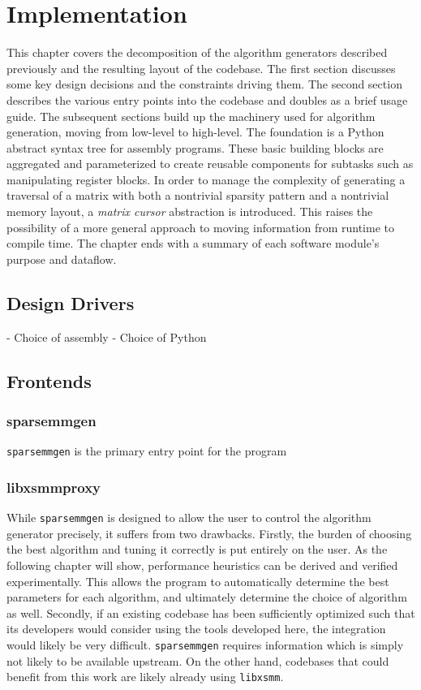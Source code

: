 
\chapter{Implementation}
\label{chapter:implementation}

This chapter covers the decomposition of the algorithm generators described previously and the resulting layout of the codebase. The first section discusses some key design decisions and the constraints driving them. The second section describes the various entry points into the codebase and doubles as a brief usage guide. The subsequent sections build up the machinery used for algorithm generation, moving from low-level to high-level. The foundation is a Python abstract syntax tree for assembly programs. These basic building blocks are aggregated and parameterized to create reusable components for subtasks such as manipulating register blocks. In order to manage the complexity of generating a traversal of a matrix with both a nontrivial sparsity pattern and a nontrivial memory layout, a \emph{matrix cursor} abstraction is introduced. This raises the possibility of a more general approach to moving information from runtime to compile time. The chapter ends with a summary of each software module's purpose and dataflow.

\section{Design Drivers}

- Choice of assembly
- Choice of Python


\section{Frontends}

\subsection{sparsemmgen}

\texttt{sparsemmgen} is the primary entry point for the program 

\subsection{libxsmmproxy}

While \texttt{sparsemmgen} is designed to allow the user to control the algorithm generator precisely, it suffers from two drawbacks. Firstly, the burden of choosing the best algorithm and tuning it correctly is put entirely on the user. As the following chapter will show, performance heuristics can be derived and verified experimentally. This allows the program to automatically determine the best parameters for each algorithm, and ultimately determine the choice of algorithm as well. Secondly, if an existing codebase has been sufficiently optimized such that its developers would consider using the tools developed here, the integration would likely be very difficult. \texttt{sparsemmgen} requires information which is simply not likely to be available upstream. On the other hand, codebases that could benefit from this work are likely already using \texttt{libxsmm}. 

